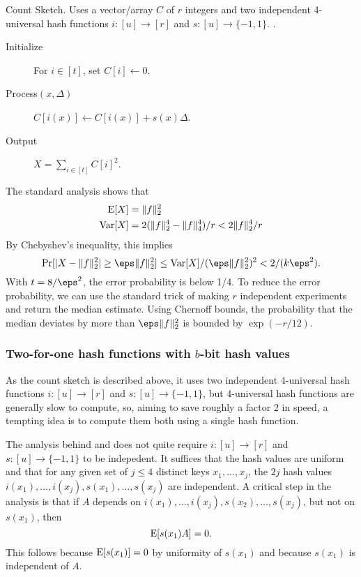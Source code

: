 \begin{algorithm}
   \caption{\label{alg:count-sketch} Count Sketch. Uses a
      vector/array $C$ of $r$ integers and two independent
      4-universal hash functions $i:[u]\to[r]$ and $s:[u]\to\{-1,1\}$.
   .}
   \begin{description}
      \item[Initialize] For $i\in[t]$, set $C[i]\gets 0$.
      \item[Process$(x,\Delta)$] $C[i(x)]\gets C[i(x)]+s(x) \Delta$. 
      \item[Output] $X=\sum_{i\in[t]} C[i]^2$.
   \end{description}
\end{algorithm}
The standard analysis \cite{charikar04count-sketch} shows that 
\begin{align}
   \operatorname*{E}[X]&= \| f\|_2^2 \label{eq:E-F2}\\
   \operatorname*{Var}[X]&=2(\| f\|_2^4 - \| f\|_4^4)/r<2\| f\|_2^4/r \label{eq:V-F2}
\end{align}
By Chebyshev's inequality, this implies
\[\Pr[|X-\| f\|_2^2|\geq \eps \| f\|_2^2]\leq \Var[X]/(\eps \| f\|_2^2)^2<
2/(k\eps^2).\]
With $t=8/\eps^2$, the error probability is below 1/4.
To
reduce the error probability, we can use the standard trick of
making $r$ independent experiments
and return the median estimate. Using Chernoff bounds, the probability
that the median deviates by more than $\eps \| f\|_2^2$ is bounded by
$\exp(-r/12)$.

\subsubsection{Two-for-one hash functions with \texorpdfstring{$b$}{b}-bit hash values}
As the count sketch is described above,
it uses two independent 4-universal hash functions
$i:[u]\to[r]$ and $s:[u]\to\{-1,1\}$, but 4-universal hash functions
are generally slow to compute, so, aiming to save roughly a factor 2
in speed, a tempting idea is to compute them both using a single hash
function.

The analysis behind  and  does not quite
require $i:[u]\to[r]$ and $s:[u]\to\{-1,1\}$ to be indepedent.
It suffices that the hash values are uniform and that for any
given set of $j\leq 4$ distinct keys $x_1,\ldots,x_j$, the $2j$ hash
values $i(x_1),\ldots,i(x_j),s(x_1),\ldots,s(x_j)$ are independent.
A critical step in the analysis is that if
$A$ depends on $i(x_1),\ldots,i(x_j),s(x_2),\ldots,s(x_j)$, but
not on $s(x_1)$, then
\[\operatorname*{E}[s(x_1)A]=0.\]
This follows because $\operatorname*{E}[s(x_1)]=0$ by uniformity of $s(x_1)$ and because $s(x_1)$ is independent of $A$.


